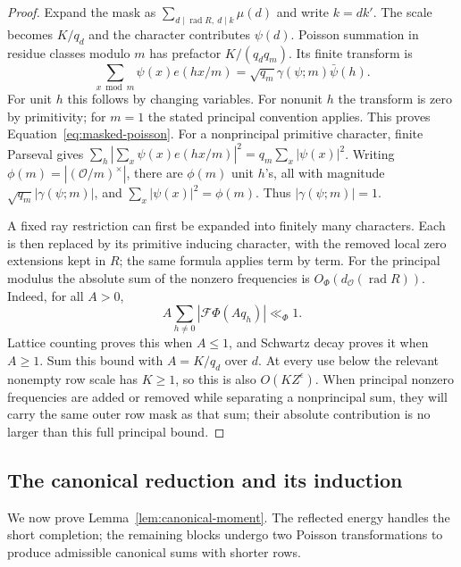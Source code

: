 \documentclass[12pt]{article}
\begin{document}
\begin{proof}
Expand the mask as
\(\sum_{d\mid\operatorname{rad}R,\ d\mid k}\mu(d)\) and write \(k=dk'\).
The scale becomes \(K/q_d\) and the character contributes \(\psi(d)\).
Poisson summation in residue classes modulo \(m\) has prefactor
\(K/(q_dq_m)\).  Its finite transform is
\[
 \sum_{x\bmod m}\psi(x)e(hx/m)
   =\sqrt{q_m}\gamma(\psi;m)\bar\psi(h).
\]
For unit \(h\) this follows by changing variables.  For nonunit \(h\)
the transform is zero by primitivity; for \(m=1\) the stated principal
convention applies.  This proves Equation~\eqref{eq:masked-poisson}.
For a nonprincipal primitive character, finite Parseval gives
\(\sum_h|\sum_x\psi(x)e(hx/m)|^2=q_m\sum_x|\psi(x)|^2\).
Writing \(\phi(m)=|(\mathcal O/m)^\times|\), there are \(\phi(m)\)
unit \(h\)'s, all with magnitude
\(\sqrt{q_m}|\gamma(\psi;m)|\), and
\(\sum_x|\psi(x)|^2=\phi(m)\).  Thus \(|\gamma(\psi;m)|=1\).

A fixed ray restriction can first be expanded into finitely many
characters.  Each is then replaced by its primitive inducing character,
with the removed local zero extensions kept in \(R\); the same formula
applies term by term.  For the principal modulus the absolute sum of
the nonzero frequencies is \(O_\Phi(d_{\mathcal O}(\operatorname{rad}R))\).
Indeed, for all \(A>0\),
\[
 A\sum_{h\ne0}|\mathcal F\Phi(Aq_h)|\ll_\Phi1.
\]
Lattice counting proves this when \(A\le1\), and Schwartz decay proves
it when \(A\ge1\).  Sum this bound with \(A=K/q_d\) over \(d\).
At every use below the relevant nonempty row scale has \(K\ge1\), so
this is also \(O(KZ^\epsilon)\).  When principal nonzero frequencies
are added or removed while separating a nonprincipal sum, they will
carry the same outer row mask as that sum; their absolute contribution
is no larger than this full principal bound.
\end{proof}

\subsection{The canonical reduction and its induction}

We now prove Lemma~\ref{lem:canonical-moment}.  The reflected energy
handles the short completion; the remaining blocks undergo two Poisson
transformations to produce admissible canonical sums with shorter rows.
\end{document}
